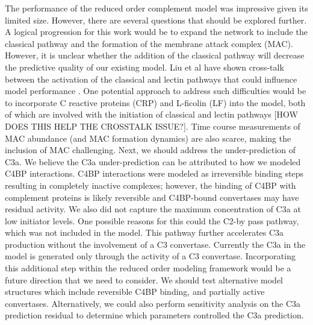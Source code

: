 \documentclass[12pt]{article}
\begin{document}
The performance of the reduced order complement model was impressive given its limited size.
However, there are several questions that should be explored further.
A logical progression for this work would be to expand the network to include the classical pathway and the formation of the membrane attack complex (MAC).
However, it is unclear whether the addition of the classical pathway will decrease the predictive quality of our existing model.
Liu et al have shown cross-talk between the activation of the classical and lectin pathways that could influence model performance \cite{liu2011computational}.
One potential approach to address such difficulties would be to incorporate C reactive proteins (CRP) and L-ficolin (LF) into the model,
both of which are involved with the initiation of classical and lectin pathways [HOW DOES THIS HELP THE CROSSTALK ISSUE?].
Time course measurements of MAC abundance (and MAC formation dynamics) are also scarce, making the inclusion of MAC challenging.
Next, we should address the under-prediction of C3a. We believe the C3a under-prediction can be attributed to how we modeled C4BP interactions.
C4BP interactions were modeled as irreversible binding steps resulting in completely inactive complexes;
however, the binding of C4BP with complement proteins is likely reversible and C4BP-bound convertases may have residual activity.
We also did not capture the maximum concentration of C3a at low initiator levels.
One possible reasons for this could the C2-by pass pathway, which was not included in the model.
This pathway further accelerates C3a production without the involvement of a C3 convertase.
Currently the C3a in the model is generated only through the activity of a C3 convertase.
Incorporating this additional step within the reduced order modeling framework would be a future direction that we need to consider.
We should test alternative model structures which include reversible C4BP binding, and partially active convertases.
Alternatively, we could also perform sensitivity analysis on the C3a prediction residual to determine which parameters controlled the C3a prediction.

\end{document}
